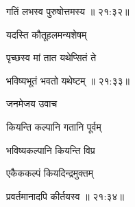 

\nemslokad

{\devanagarifont गतिं लभस्व पुरुषोत्तमस्य {॥ २१:३२॥} \veg\dontdisplaylinenum }%

\ujvers{}    %


\nemslokab

{\devanagarifont यदस्ति कौतूहलमन्यशेषम्  \danda\dontdisplaylinenum }%
 
\nemslokac

{\devanagarifont पृच्छस्व मां तात यथेप्सितं ते }%
  \dontdisplaylinenum


\nemslokad

{\devanagarifont भविष्यभूतं भवतो यथेष्टम् {॥ २१:३३॥} \veg\dontdisplaylinenum }%

\vers


{\devanagarifont जनमेजय उवाच {\dandab}\dontdisplaylinenum  }%

\nemsloka 
{\devanagarifont कियन्ति कल्पानि गतानि पूर्वम् }%
  \dontdisplaylinenum    {}%


\nemslokab

{\devanagarifont भविष्यकल्पानि कियन्ति विप्र  \danda\dontdisplaylinenum }%

\nemslokac

{\devanagarifont एकैककल्पं कियदिन्द्रमुक्तम् }%
  \dontdisplaylinenum    {}%



\nemslokad

{\devanagarifont प्रवर्तमानादपि कीर्तयस्व {॥ २१:३४॥} \veg\dontdisplaylinenum }%
 
